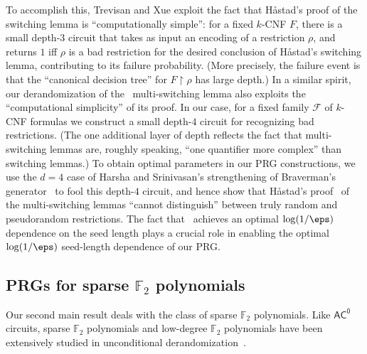 \documentclass[11pt]{article}
\numberwithin{equation}{section}
\theoremstyle{definition}
\theoremstyle{plain}
\theoremstyle{plain}
\newcommand{\acz}{\mathsf{AC^0}}
\newcommand{\uhr}{\upharpoonright}
\renewcommand{\F}{\mathds{F}}
\begin{document}
To accomplish this, Trevisan and Xue exploit the fact that H{\aa}stad's proof of the switching lemma is ``computationally simple'': for a fixed $k$-CNF $F$, there is a small depth-$3$ circuit that takes as input an encoding of a restriction $\rho$, and returns $1$ iff $\rho$ is a bad restriction for the desired conclusion of H{\aa}stad's switching lemma, contributing to its failure probability.
%
(More precisely,   %
the failure event is that the ``canonical decision tree'' for $F \uhr \rho$ has large depth.)   %
In
a  %
similar spirit, our derandomization of the~\cite{Has14} multi-switching lemma also exploits the ``computational simplicity'' of its proof. In our case, for a fixed family $\mathscr{F}$ of $k$-CNF formulas we construct a small depth-$4$ circuit for recognizing bad restrictions.
%
(The one  %
additional layer of depth reflects the fact that multi-switching lemmas are, roughly speaking, ``one quantifier more complex'' than switching lemmas.)   %
To obtain optimal parameters in our PRG constructions, we use the $d=4$ case of Harsha and Srinivasan's strengthening of Braverman's generator~\cite{HS16journal} to fool this depth-$4$ circuit, and hence show %
that H{\aa}stad's proof~\cite{Has14}   %
of the multi-switching lemmas ``cannot distinguish'' between truly random and pseudorandom restrictions. The fact that~\cite{HS16journal}
achieves an optimal $\log(1/\eps)$ 
%
%
%
%
%
dependence on the seed length %
plays a crucial role in enabling the optimal 
$\log(1/\eps)$ %
seed-length %
dependence of our PRG. 
%
%


\subsection{PRGs for sparse $\F_2$ polynomials} \label{sec:F2}

Our second main result deals with the class of sparse $\F_2$ polynomials.  Like $\acz$ circuits, sparse $\F_2$ polynomials and low-degree $\F_2$ polynomials have been extensively studied in unconditional derandomization~\cite{NN93,AGHP92,LVW93,Bog05,Vio06,Lov09,Vio09,BV10,LS11,Lu12,CHLT19}.   
\end{document}
